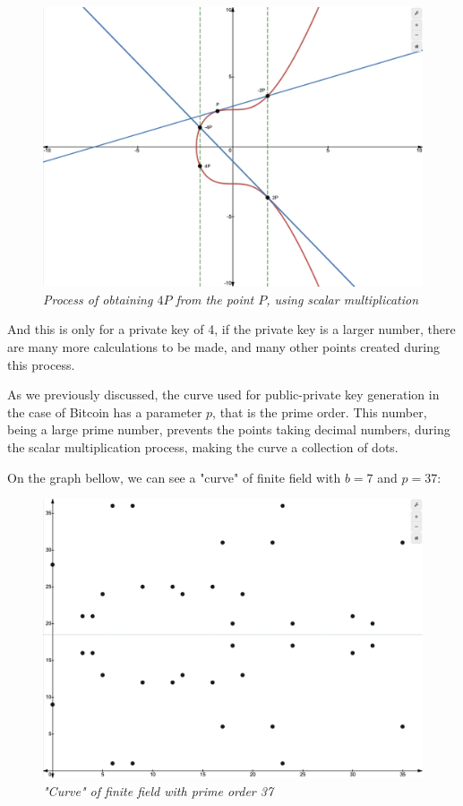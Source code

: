 \documentclass{article}
\begin{document}
\begin{figure}[H]
    \begin{center}
        \includegraphics[width=0.5 \textwidth]{images/Kobiltz_curve_with_points.png}
        \caption{\textit{Process of obtaining \(4P\) from the point \(P\), using scalar multiplication}}
    \end{center}
\end{figure}

And this is only for a private key of 4, if the private key is a larger number, there are many more calculations to be made, and many other points created during this process. 

As we previously discussed, the curve used for public-private key generation in the case of Bitcoin has a parameter \(p\), that is the prime order. This number, being a large prime number, prevents the points taking decimal numbers, during the scalar multiplication process, making the curve a collection of dots.

On the graph bellow, we can see a "curve" of finite field with \(b = 7\) and \(p = 37\):

\begin{figure}[H]
    \begin{center}
        \includegraphics[width=0.6 \textwidth]{images/finite_field_b7_p37.png}
        \caption{\textit{"Curve" of finite field with prime order 37}}
    \end{center}
\end{figure}
\end{document}

